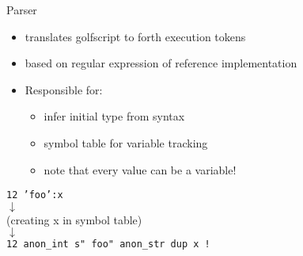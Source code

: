 \documentclass{beamer}
\begin{document}
\begin{frame}
    Parser
    \begin{itemize}
        \item translates golfscript to forth execution tokens 
        \item based on regular expression of reference implementation 
        \item Responsible for:
        \begin{itemize}
            \item infer initial type from syntax
            \item symbol table for variable tracking
            \item note that every value can be a variable!
        \end{itemize}
    \end{itemize}



\begin{center}
    \small{    
    \texttt{12 'foo':x} \\
$\downarrow$ \\
(creating x in symbol table) \\
$\downarrow$ \\
    \texttt{12 anon\_int s" foo" anon\_str dup x !} \\
}
\end{center}

\end{frame}
\end{document}

